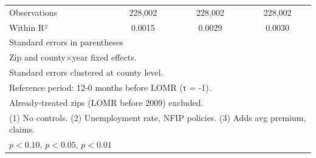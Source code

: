\begin{table}[htbp]
\begin{tabular}{l*{3}{c}}
\hline
Observations        &     228,002         &     228,002         &     228,002         \\
Within R²           &      0.0015         &      0.0029         &      0.0030         \\
\hline\hline
\multicolumn{4}{l}{\footnotesize Standard errors in parentheses}\\
\multicolumn{4}{l}{\footnotesize Zip and county×year fixed effects.}\\
\multicolumn{4}{l}{\footnotesize Standard errors clustered at county level.}\\
\multicolumn{4}{l}{\footnotesize Reference period: 12-0 months before LOMR (τ = -1).}\\
\multicolumn{4}{l}{\footnotesize Already-treated zips (LOMR before 2009) excluded.}\\
\multicolumn{4}{l}{\footnotesize (1) No controls. (2) Unemployment rate, NFIP policies. (3) Adds avg premium, claims.}\\
\multicolumn{4}{l}{\footnotesize \sym{*} \(p<0.10\), \sym{**} \(p<0.05\), \sym{***} \(p<0.01\)}\\
\end{tabular}
\end{table}
